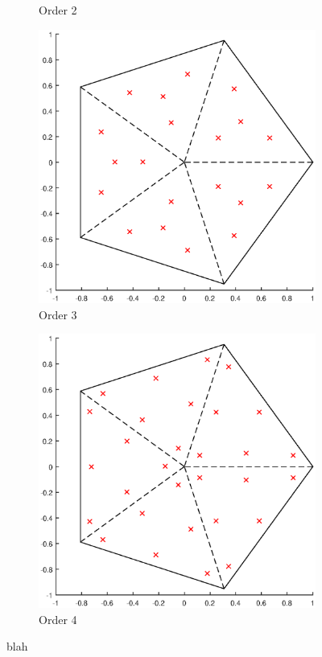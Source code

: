 \begin{figure}
{\begin{subfigure}[b]{0.475\textwidth}
		\caption{Order 2}
	\end{subfigure}
}
\vspace{3mm}
{
	\begin{subfigure}[b]{0.475\textwidth}
		\centering
		\label{subfig::2DInt_V5_Q3}
		\includegraphics[width=\textwidth]{figures/sec_BF/V5_Q3.eps}
		\caption{Order 3}
	\end{subfigure}
	\hfill
	\begin{subfigure}[b]{0.475\textwidth}
		\centering
		\label{subfig::2DInt_V5_Q4}
		\includegraphics[width=\textwidth]{figures/sec_BF/V5_Q4.eps}
		\caption{Order 4}
	\end{subfigure}
}
\caption{blah}
\label{fig::BF_2DIntegration_Pentagon}
\end{figure}

